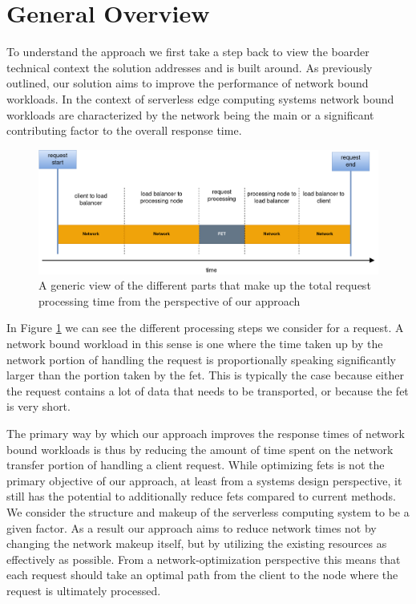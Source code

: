 \section{General Overview}

To understand the approach we first take a step back to view the boarder technical context the solution addresses and is built around.
As previously outlined, our solution aims to improve the performance of network bound workloads.
In the context of serverless edge computing systems network bound workloads are characterized by the network being the main or a significant contributing factor to the overall response time.
\begin{figure}
    \centering
    \includegraphics[width=14cm]{graphics/diagrams/request_overview.png}
    \caption{A generic view of the different parts that make up the total request processing time from the perspective of our approach}
    \label{fig:request_net_fet_overview}
\end{figure}
In Figure \ref{fig:request_net_fet_overview} we can see the different processing steps we consider for a request.
A network bound workload in this sense is one where the time taken up by the network portion of handling the request is proportionally speaking significantly larger than the portion taken by the \gls{fet}.
This is typically the case because either the request contains a lot of data that needs to be transported, or because the \gls{fet} is very short.

The primary way by which our approach improves the response times of network bound workloads is thus by reducing the amount of time spent on the network transfer portion of handling a client request.
While optimizing \glspl{fet} is not the primary objective of our approach, at least from a systems design perspective, it still has the potential to additionally reduce \glspl{fet} compared to current methods.
We consider the structure and makeup of the serverless computing system to be a given factor. As a result our approach aims to reduce network times not by changing the network makeup itself, but by utilizing the existing resources as effectively as possible. From a network-optimization perspective this means that each request should take an optimal path from  the client to the node where the request is ultimately processed. 

